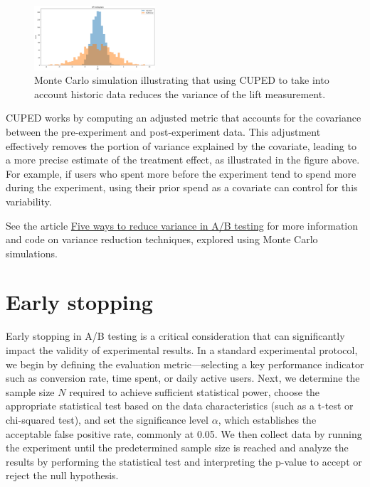 \documentclass[final,5p,times,twocolumn,authoryear]{elsarticle}
\begin{document}
\begin{figure}[h]
	\centering 
	\includegraphics[width=0.4\textwidth]{fig-3.png}	
	\caption{Monte Carlo simulation illustrating that using CUPED to take into account historic data reduces the variance of the lift measurement.} 
\end{figure}

CUPED works by computing an adjusted metric that accounts for the covariance between the pre-experiment and post-experiment data. This adjustment effectively removes the portion of variance explained by the covariate, leading to a more precise estimate of the treatment effect, as illustrated in the figure above. For example, if users who spent more before the experiment tend to spend more during the experiment, using their prior spend as a covariate can control for this variability.

See the article \href{https://bytepawn.com/five-ways-to-reduce-variance-in-ab-testing.html}{Five ways to reduce variance in A/B testing} for more information and code on variance reduction techniques, explored using Monte Carlo simulations.

\section{Early stopping}

Early stopping in A/B testing is a critical consideration that can significantly impact the validity of experimental results. In a standard experimental protocol, we begin by defining the evaluation metric—selecting a key performance indicator such as conversion rate, time spent, or daily active users. Next, we determine the sample size $ N $ required to achieve sufficient statistical power, choose the appropriate statistical test based on the data characteristics (such as a t-test or chi-squared test), and set the significance level $ \alpha $, which establishes the acceptable false positive rate, commonly at 0.05. We then collect data by running the experiment until the predetermined sample size is reached and analyze the results by performing the statistical test and interpreting the p-value to accept or reject the null hypothesis.
\end{document}
